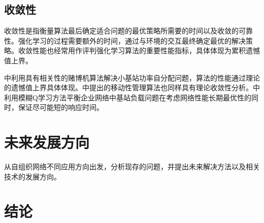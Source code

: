 ﻿\documentclass[11pt,draftclsnofoot,onecolumn,journal,letterpaper]{IEEEtran}
\begin{document}
\subsection{收敛性}
收敛性是指衡量算法最后确定适合问题的最优策略所需要的时间以及收敛的可靠性。强化学习的过程需要额外的时间，通过与环境的交互最终确定最优的解决策略。收敛性能也经常用作评判强化学习算法的重要性能指标，具体体现为累积遗憾值上界。

\cite{Wang2017}中利用具有相关性的赌博机算法解决小基站功率自分配问题，算法的性能通过理论的遗憾值上界具体体现。\cite{Shen2016}中提出的移动性管理算法也同样具有理论收敛性分析。\cite{Munoz2013}中利用模糊Q学习方法平衡企业网络中基站负载问题在考虑网络性能长期最优性的同时，保证尽可能短的响应时间。

\section{未来发展方向}
\label{sec:Conclusion}
从自组织网络不同应用方向出发，分析现存的问题，并提出未来解决方法以及相关技术的发展方向。

\section{结论}





\end{document}
